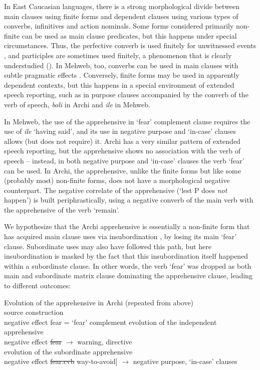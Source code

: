 \documentclass[output=paper,colorlinks,citecolor=brown]{langscibook}
\begin{document}
In East Caucasian languages, there is a strong morphological divide between main clauses using finite forms and dependent clauses using various types of converbs, infinitives and action nominals. Some forms considered primarily non-finite can be used as main clause predicates, but this happens under special circumstances. Thus, the perfective converb is used finitely for unwitnessed  events \citep{Kibrik1977}, and participles are sometimes used finitely, a phenomenon that is clearly understudied (\citealt{KalininaSumbatova2007,Kalinina2011}). In Mehweb, too, converbs can be used in main clauses with subtle pragmatic effects \citep{Kustova2019}. Conversely, finite forms may be used in apparently dependent contexts, but this happens in a special environment of extended speech reporting, such as in purpose clauses accompanied by the converb of the verb of speech, \textit{boli} in Archi and \textit{ile} in Mehweb.  

In Mehweb, the use of the apprehensive in `fear' complement clause requires the use of \textit{ile} `having said', and its use in negative purpose and `in-case' clauses allows (but does not require) it. Archi has a very similar pattern of extended speech reporting, but the apprehensive shows no association with the verb of speech -- instead, in both negative purpose and `in-case' clauses the verb `fear' can be used. In Archi, the apprehensive, unlike the finite forms but like some (probably most) non-finite forms, does not have a morphological negative counterpart. The negative correlate of the apprehensive (`lest P does \textit{not} happen') is built periphrastically, using a negative converb of the main verb with the apprehensive of the verb `remain'. 

We hypothesize that the Archi apprehensive is essentially a non-finite form that has acquired main clause uses via insubordination \citep{evans2007insubordination}, by losing its main `fear' clause. Subordinate uses may also have followed this path, but here insubordination is masked by the fact that this insubordination itself happened within a subordinate clause. In other words, the verb `fear' was dropped as both main and subordinate matrix clause dominating the apprehensive clause, leading to different outcomes:

\ea \label{ex:DD79} \textnormal{Evolution of the apprehensive in Archi (repeated from  above)} \\
\ea \label{ex:DD79a} \textnormal{source construction} \\
\textnormal{{\ob\ob}negative effect{\cb} fear{\cb} = `fear' complement}
\ex \label{ex:DD79b} \textnormal{evolution of the independent apprehensive} \\
\textnormal{{\ob\ob}negative effect{\cb} \sout{fear}{\cb} $\rightarrow$ warning, directive}  \\
\ex \label{ex:DD79c} \textnormal{evolution of the subordinate apprehensive} \\
\textnormal{{\ob\ob\ob}negative effect{\cb} \sout{fear.cvb}{\cb} way-to-avoid] $\rightarrow$ negative purpose, `in-case' clauses} \\
\z
\z
\end{document}
